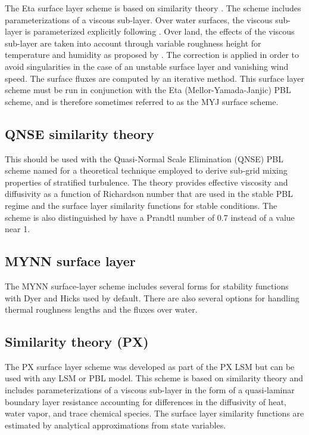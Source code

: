 The Eta surface layer scheme \citep{janjic96,janjic02} is based 
on similarity theory \citep{monin54}. The scheme 
includes parameterizations of a viscous sub-layer. Over water surfaces, the 
viscous sub-layer is parameterized explicitly following \citet{janjic94}. 
Over land, the effects of the viscous sub-layer are taken into account 
through variable roughness height for temperature and humidity as proposed by 
\citet{zilit95}. The \citet{beljaars94} correction is applied in order 
to avoid singularities in the case of an unstable surface layer and vanishing 
wind speed. The surface fluxes are computed by an iterative method. 
This surface layer scheme must be run in conjunction with the Eta
(Mellor-Yamada-Janjic) PBL scheme, and is therefore sometimes referred to
as the MYJ surface scheme.

\subsection{QNSE similarity theory}

This should be used with the Quasi-Normal Scale Elimination (QNSE) PBL scheme
\citep{sukoriansky05} named for a theoretical technique employed to derive sub-grid
mixing properties of stratified turbulence. The theory provides effective viscosity and
diffusivity as a function of Richardson number that are used in the stable PBL regime
and the surface layer similarity functions for stable conditions. The scheme is also
distinguished by have a Prandtl number of 0.7 instead of a value near 1. 

\subsection{MYNN surface layer}

The MYNN surface-layer scheme includes  several forms for stability functions with Dyer and Hicks
used by default. There are also several options for handling thermal roughness lengths and the 
fluxes over water.

\subsection{Similarity theory (PX)}

The PX surface layer scheme \citep{pleim06} was developed as part of the PX LSM but can be used with any LSM or PBL model.  This scheme is based on similarity theory and includes parameterizations of a viscous sub-layer in the form of a quasi-laminar boundary layer resistance accounting for differences in the diffusivity of heat, water vapor, and trace chemical species.   The surface layer similarity functions are estimated by analytical approximations from state variables.  

